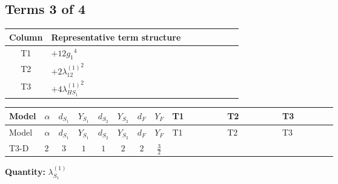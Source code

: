 \documentclass[8pt]{article}
\begin{document}
\begin{landscape}
\subsection*{Terms 3 of 4}
\begin{center}
\begin{tabular}{@{}c >{\raggedright\arraybackslash}p{0.82\linewidth}@{}}
\toprule
Column & Representative term structure \\
\midrule
T1 & \(\displaystyle +12 {g_1}^4\) \\
\midrule
T2 & \(\displaystyle +2 {\lambda_{12}^{(1)}}^2\) \\
\midrule
T3 & \(\displaystyle +4 {\lambda_{HS_1}^{(1)}}^2\) \\
\midrule
\bottomrule
\end{tabular}
\end{center}
\smallskip
\tiny
\begin{longtable}{@{}llcccccc >{\raggedright\arraybackslash}p{0.21\linewidth} >{\raggedright\arraybackslash}p{0.21\linewidth} >{\raggedright\arraybackslash}p{0.21\linewidth}@{}}
\toprule
Model & $\alpha$ & $d_{S_1}$ & $Y_{S_1}$ & $d_{S_2}$ & $Y_{S_2}$ & $d_F$ & $Y_F$ & T1 & T2 & T3 \\
\midrule
\endfirsthead
\toprule
Model & $\alpha$ & $d_{S_1}$ & $Y_{S_1}$ & $d_{S_2}$ & $Y_{S_2}$ & $d_F$ & $Y_F$ & T1 & T2 & T3 \\
\midrule
\endhead
T3-D & $2$ & $3$ & $1$ & $1$ & $2$ & $2$ & $\frac{3}{2}$ & \scriptsize\adjustbox{max width=\linewidth}{$\begin{gathered} +12 {g_1}^4\end{gathered}$} & \scriptsize\adjustbox{max width=\linewidth}{$\begin{gathered} +2 {\lambda_{12}^{(1)}}^2\end{gathered}$} & \scriptsize\adjustbox{max width=\linewidth}{$\begin{gathered} +4 {\lambda_{HS_1}^{(1)}}^2\end{gathered}$} \\
\midrule
\bottomrule
\end{longtable}
\clearpage
\noindent\textbf{Quantity: }$\lambda_{S_1}^{(1)}$\par\smallskip

\end{landscape}
\end{document}
